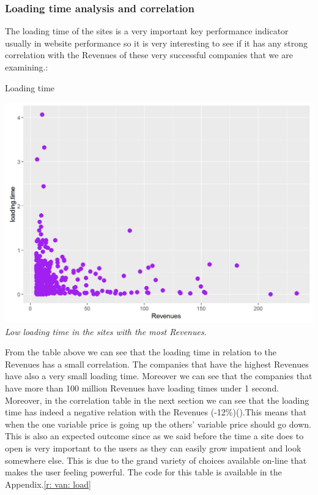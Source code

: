 \documentclass{book}
\begin{document}
\subsubsection{Loading time analysis and correlation}
The loading time of the sites is a very important key performance indicator usually in website performance so it is very interesting to see if it has any strong correlation with the Revenues of these very successful companies that we are examining.:
\begin{table}[H]
\centering
\caption{Loading time}
\begin{center}
\includegraphics[scale=0.4]{../R/photos/31_ld_rev.png}  \\
\textit{Low loading time in the sites with the most Revenues.}
\end{center}
\end{table}
From the table above we can see that the loading time in relation to the Revenues has a small correlation. The companies that have the highest Revenues have also a very small loading time. Moreover we can see that the companies that have more than 100 million Revenues have loading times under 1 second. Moreover, in the correlation table in the next section we can see that the loading time has indeed a negative relation with the Revenues (-12\%)(\pageref{lod}).This means that when the one variable price is going up the others' variable price should go down. This is also an expected outcome since as we said before the time a site does to open is very important to the users as they can easily grow impatient and look somewhere else. This is due to the grand variety of choices available on-line that makes the user feeling powerful. The code for this table is available in the Appendix.\ref{r: van: load}
\end{document}
